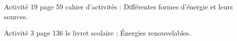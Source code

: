 \begin{myact}{}
	Activité 19 page 59 cahier d'activités : Différentes formes d'énergie et leurs sources.
	 
	Activité 3 page 136 le livret scolaire : Énergies renouvelables. 
\end{myact}